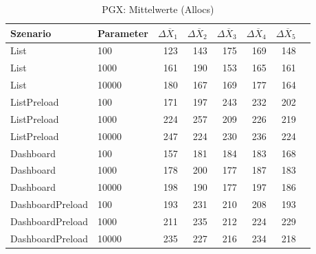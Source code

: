 
\begin{table}[ht]
\setlength{\extrarowheight}{-1pt}
\centering
\caption{PGX: Mittelwerte (Allocs)}
\begin{tabular}{llrrrrrr}
\toprule
Szenario & Parameter & ${\Delta \overline{X}_1}$ & ${\Delta \overline{X}_2}$ & ${\Delta \overline{X}_3}$ & ${\Delta \overline{X}_4}$ & ${\Delta \overline{X}_5}$ \\
\midrule
	List & 100 & 123 & 143 & 175 & 169 & 148 \\
	List & 1000 & 161 & 190 & 153 & 165 & 161 \\
	List & 10000 & 180 & 167 & 169 & 177 & 164 \\
	ListPreload & 100 & 171 & 197 & 243 & 232 & 202 \\
	ListPreload & 1000 & 224 & 257 & 209 & 226 & 219 \\
	ListPreload & 10000 & 247 & 224 & 230 & 236 & 224 \\
	Dashboard & 100 & 157 & 181 & 184 & 183 & 168 \\
	Dashboard & 1000 & 178 & 200 & 177 & 187 & 183 \\
	Dashboard & 10000 & 198 & 190 & 177 & 197 & 186 \\
	DashboardPreload & 100 & 193 & 231 & 210 & 208 & 193 \\
	DashboardPreload & 1000 & 211 & 235 & 212 & 224 & 229 \\
	DashboardPreload & 10000 & 235 & 227 & 216 & 234 & 218 \\
\bottomrule
\end{tabular}
\label{tab:mittelwerte_pgx_allocs}
\end{table}
	